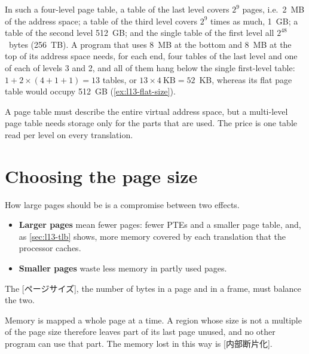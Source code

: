\documentclass[../main.tex]{subfiles}
\begin{document}
\begin{example}
  \label{ex:l13-four-level}
  In such a four-level page table, a table of the last level covers $2^{9}$
  pages, i.e.\ 2~MB of the address space; a table of the third level covers
  $2^{9}$ times as much, 1~GB; a table of the second level 512~GB; and the
  single table of the first level all $2^{48}$~bytes (256~TB).  A program that
  uses 8~MB at the bottom and 8~MB at the top of its address space needs, for
  each end, four tables of the last level and one of each of levels 3 and 2,
  and all of them hang below the single first-level table:
  $1 + 2 \times (4 + 1 + 1) = 13$ tables, or $13 \times 4~\text{KB} = 52$~KB,
  whereas its flat page table would occupy 512~GB (\cref{ex:l13-flat-size}).
\end{example}

\begin{keypoint}
  A page table must describe the entire virtual address space, but a
  multi-level page table needs storage only for the parts that are used.  The
  price is one table read per level on every translation.
\end{keypoint}

\section{Choosing the page size}
\label{sec:l13-page-size}

How large pages should be is a compromise between two
effects.
\begin{itemize}
  \item \textbf{Larger pages} mean fewer pages: fewer PTEs and a smaller page
    table, and, as \cref{sec:l13-tlb} shows, more memory covered by each
    translation that the processor caches.
  \item \textbf{Smaller pages} waste less memory in partly used pages.
\end{itemize}
The [ページサイズ], the number of bytes in a page and in a
frame, must balance the two.

\begin{definition}
  Memory is mapped a whole page at a time.  A region whose size is not a
  multiple of the page size therefore leaves part of its last page unused, and
  no other program can use that part.  The memory lost in this way is
  [内部断片化].
\end{definition}
\end{document}
